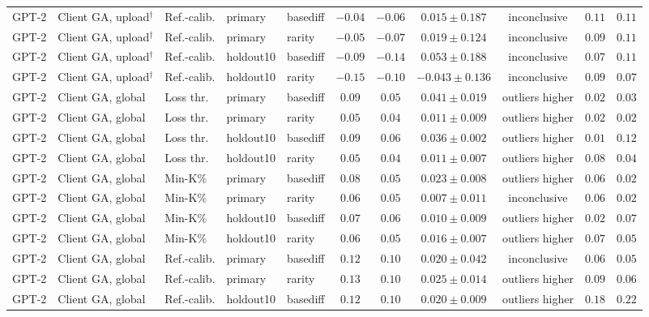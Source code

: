 {\begin{longtable}{@{\extracolsep{\fill}}lllllcccccc@{}}
GPT-2 & Client GA, upload$^{\dagger}$ & Ref.-calib. & primary & basediff & $-0.04$ & $-0.06$ & $0.015 \pm 0.187$ & inconclusive & $0.11$ & $0.11$ \\
GPT-2 & Client GA, upload$^{\dagger}$ & Ref.-calib. & primary & rarity & $-0.05$ & $-0.07$ & $0.019 \pm 0.124$ & inconclusive & $0.09$ & $0.11$ \\
GPT-2 & Client GA, upload$^{\dagger}$ & Ref.-calib. & holdout10 & basediff & $-0.09$ & $-0.14$ & $0.053 \pm 0.188$ & inconclusive & $0.07$ & $0.11$ \\
GPT-2 & Client GA, upload$^{\dagger}$ & Ref.-calib. & holdout10 & rarity & $-0.15$ & $-0.10$ & $-0.043 \pm 0.136$ & inconclusive & $0.09$ & $0.07$ \\
GPT-2 & Client GA, global & Loss thr. & primary & basediff & $0.09$ & $0.05$ & $0.041 \pm 0.019$ & outliers higher & $0.02$ & $0.03$ \\
GPT-2 & Client GA, global & Loss thr. & primary & rarity & $0.05$ & $0.04$ & $0.011 \pm 0.009$ & outliers higher & $0.02$ & $0.02$ \\
GPT-2 & Client GA, global & Loss thr. & holdout10 & basediff & $0.09$ & $0.06$ & $0.036 \pm 0.002$ & outliers higher & $0.01$ & $0.12$ \\
GPT-2 & Client GA, global & Loss thr. & holdout10 & rarity & $0.05$ & $0.04$ & $0.011 \pm 0.007$ & outliers higher & $0.08$ & $0.04$ \\
GPT-2 & Client GA, global & Min-K\% & primary & basediff & $0.08$ & $0.05$ & $0.023 \pm 0.008$ & outliers higher & $0.06$ & $0.02$ \\
GPT-2 & Client GA, global & Min-K\% & primary & rarity & $0.06$ & $0.05$ & $0.007 \pm 0.011$ & inconclusive & $0.06$ & $0.02$ \\
GPT-2 & Client GA, global & Min-K\% & holdout10 & basediff & $0.07$ & $0.06$ & $0.010 \pm 0.009$ & outliers higher & $0.02$ & $0.07$ \\
GPT-2 & Client GA, global & Min-K\% & holdout10 & rarity & $0.06$ & $0.05$ & $0.016 \pm 0.007$ & outliers higher & $0.07$ & $0.05$ \\
GPT-2 & Client GA, global & Ref.-calib. & primary & basediff & $0.12$ & $0.10$ & $0.020 \pm 0.042$ & inconclusive & $0.06$ & $0.05$ \\
GPT-2 & Client GA, global & Ref.-calib. & primary & rarity & $0.13$ & $0.10$ & $0.025 \pm 0.014$ & outliers higher & $0.09$ & $0.06$ \\
GPT-2 & Client GA, global & Ref.-calib. & holdout10 & basediff & $0.12$ & $0.10$ & $0.020 \pm 0.009$ & outliers higher & $0.18$ & $0.22$ \\

\end{longtable}}
